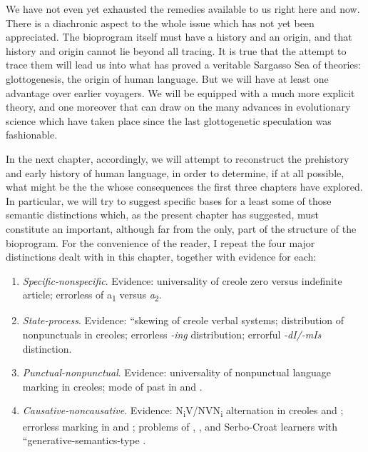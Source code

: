 We have not even yet exhausted the remedies available to us right here and now. There is a diachronic aspect to the whole issue which has not yet been appreciated. The bioprogram itself must have a history and an origin, and that history and origin cannot lie beyond all tracing. It is true that the attempt to trace them will lead us into what has proved a veritable Sargasso Sea of theories: glottogenesis, the origin of human language. But we will have at least one advantage over earlier voyagers. We will be equipped with a much more explicit theory, and one moreover that can draw on the many advances in evolutionary science which have taken place since the last  glottogenetic speculation was fashionable.


In the next chapter, accordingly, we will attempt to reconstruct the prehistory and early history of human language, in order to determine, if at all possible, what might be the  the  whose consequences the first three chapters have explored. In particular, we will try to suggest specific bases for a least some of those semantic distinctions which, as the present chapter has suggested, must constitute an important, although far from the only, part of the structure of the bioprogram. For the convenience of the reader, I repeat the four major distinctions dealt with in this chapter, together with evidence for each: 

\begin{enumerate}
	
\item\textit{Specific-nonspecific}. Evidence: universality of creole zero versus indefinite article; errorless  of a\textsubscript{1} versus \textit{a}\textsubscript{2}.

\item\textit{State-process}. Evidence: ``skewing of creole verbal systems; distribution of nonpunctuals in creoles; errorless   \textit{-ing} distribution; errorful   \textit{-dI/-mIs} distinction. 

\item\textit{Punctual-nonpunctual}. Evidence: universality of nonpunctual language marking in creoles; mode of  past  in  and . 

\item\textit{Causative-noncausative}. Evidence: N\textsubscript{i}V/NVN\textsubscript{i} alternation in creoles and ; errorless   marking in  and ; problems of , , and Serbo-Croat learners with ``generative-semantics-type . 
\end{enumerate}

